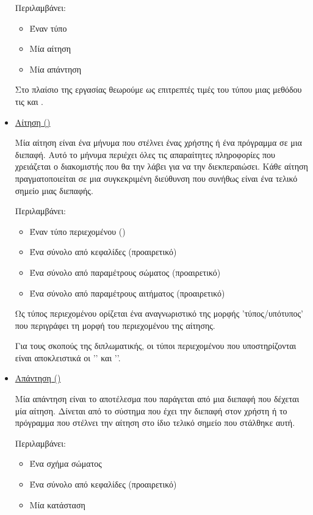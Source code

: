 \begin{itemize}
Περιλαμβάνει:
\begin{itemize}
    \item Έναν τύπο
    \item Μία αίτηση
    \item Μία απάντηση
\end{itemize}

Στο πλαίσιο της εργασίας θεωρούμε ως επιτρεπτές τιμές του τύπου μιας μεθόδου τις  και .

\item \underline{Αίτηση ()}

Μία αίτηση είναι ένα μήνυμα που στέλνει ένας χρήστης ή ένα πρόγραμμα σε μια διεπαφή.
Αυτό το μήνυμα περιέχει όλες τις απαραίτητες πληροφορίες που χρειάζεται ο διακομιστής που θα την λάβει για να την διεκπεραιώσει.
Κάθε αίτηση πραγματοποιείται σε μια συγκεκριμένη διεύθυνση που συνήθως είναι ένα τελικό σημείο μιας διεπαφής.

Περιλαμβάνει:
\begin{itemize}
    \item Έναν τύπο περιεχομένου ()
    \item Ένα σύνολο από κεφαλίδες (προαιρετικό)
    \item Ένα σύνολο από παραμέτρους σώματος (προαιρετικό)
    \item Ένα σύνολο από παραμέτρους αιτήματος (προαιρετικό)
\end{itemize}

Ως τύπος περιεχομένου ορίζεται ένα αναγνωριστικό της μορφής 'τύπος/υπότυπος'
που περιγράφει τη μορφή του περιεχομένου της αίτησης.

Για τους σκοπούς της διπλωματικής,
οι τύποι περιεχομένου που υποστηρίζονται είναι αποκλειστικά οι '' και ''.

\item \underline{Απάντηση ()}

Μία απάντηση είναι το αποτέλεσμα που παράγεται από μια διεπαφή που δέχεται μία αίτηση.
Δίνεται από το σύστημα που έχει την διεπαφή στον χρήστη ή το πρόγραμμα που στέλνει την αίτηση στο ίδιο τελικό σημείο που στάλθηκε αυτή.

Περιλαμβάνει:
\begin{itemize}
    \item Ένα σχήμα σώματος
    \item Ένα σύνολο από κεφαλίδες (προαιρετικό)
    \item Μία κατάσταση
\end{itemize}


\end{itemize}
